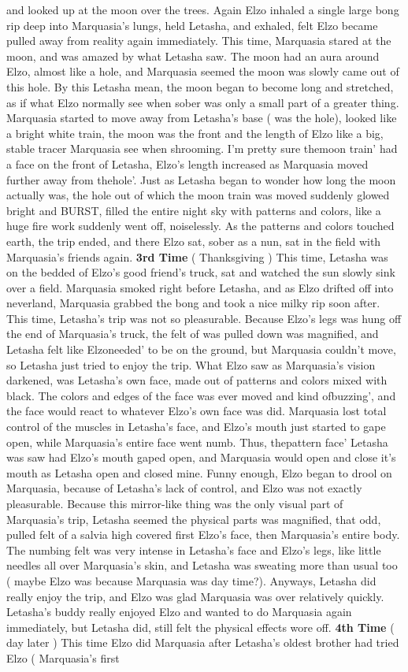 \documentclass[12pt]{book}
\begin{document}
and looked up at the moon over the trees. Again Elzo inhaled a single large bong rip deep into Marquasia's lungs, held Letasha, and exhaled, felt Elzo became pulled away from reality again immediately. This time, Marquasia stared at the moon, and was amazed by what Letasha saw. The moon had an aura around Elzo, almost like a hole, and Marquasia seemed the moon was slowly came out of this hole. By this Letasha mean, the moon began to become long and stretched, as if what Elzo normally see when sober was only a small part of a greater thing. Marquasia started to move away from Letasha's base ( was the hole), looked like a bright white train, the moon was the front and the length of Elzo like a big, stable tracer Marquasia see when shrooming. I'm pretty sure themoon train' had a face on the front of Letasha, Elzo's length increased as Marquasia moved further away from thehole'. Just as Letasha began to wonder how long the moon actually was, the hole out of which the moon train was moved suddenly glowed bright and BURST, filled the entire night sky with patterns and colors, like a huge fire work suddenly went off, noiselessly. As the patterns and colors touched earth, the trip ended, and there Elzo sat, sober as a nun, sat in the field with Marquasia's friends again. \textbf{3rd Time} ( Thanksgiving ) This time, Letasha was on the bedded of Elzo's good friend's truck, sat and watched the sun slowly sink over a field. Marquasia smoked right before Letasha, and as Elzo drifted off into neverland, Marquasia grabbed the bong and took a nice milky rip soon after. This time, Letasha's trip was not so pleasurable. Because Elzo's legs was hung off the end of Marquasia's truck, the felt of was pulled down was magnified, and Letasha felt like Elzoneeded' to be on the ground, but Marquasia couldn't move, so Letasha just tried to enjoy the trip. What Elzo saw as Marquasia's vision darkened, was Letasha's own face, made out of patterns and colors mixed with black. The colors and edges of the face was ever moved and kind ofbuzzing', and the face would react to whatever Elzo's own face was did. Marquasia lost total control of the muscles in Letasha's face, and Elzo's mouth just started to gape open, while Marquasia's entire face went numb. Thus, thepattern face' Letasha was saw had Elzo's mouth gaped open, and Marquasia would open and close it's mouth as Letasha open and closed mine. Funny enough, Elzo began to drool on Marquasia, because of Letasha's lack of control, and Elzo was not exactly pleasurable. Because this mirror-like thing was the only visual part of Marquasia's trip, Letasha seemed the physical parts was magnified, that odd, pulled felt of a salvia high covered first Elzo's face, then Marquasia's entire body. The numbing felt was very intense in Letasha's face and Elzo's legs, like little needles all over Marquasia's skin, and Letasha was sweating more than usual too ( maybe Elzo was because Marquasia was day time?). Anyways, Letasha did really enjoy the trip, and Elzo was glad Marquasia was over relatively quickly. Letasha's buddy really enjoyed Elzo and wanted to do Marquasia again immediately, but Letasha did, still felt the physical effects wore off. \textbf{4th Time} ( day later ) This time Elzo did Marquasia after Letasha's oldest brother had tried Elzo ( Marquasia's first 
\end{document}
